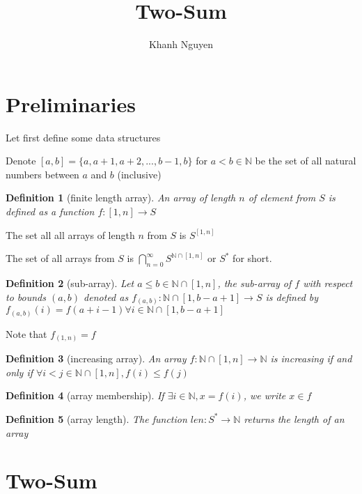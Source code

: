 \documentclass{article}
\title{Two-Sum}
\author{Khanh Nguyen}
\newtheorem{definition}{Definition}
\begin{document}
\maketitle


\section{Preliminaries}

Let first define some data structures

Denote $[a, b] = \{a, a+1, a+2, ..., b-1, b\}$ for $a < b \in \mathbb{N}$ be the set of all natural numbers between $a$ and $b$ (inclusive)


\begin{definition}[finite length array]
An array of length $n$ of element from $S$ is defined as a function $f: [1, n] \to S$
\end{definition}

The set all all arrays of length $n$ from $S$ is $S^{[1, n]}$


The set of all arrays from $S$ is $\bigcap_{n=0}^{\infty} S^{\mathbb{N} \cap [1, n]}$ or $S^*$ for short.

\begin{definition}[sub-array]
Let $a \leq b \in \mathbb{N} \cap [1, n]$, the sub-array of $f$ with respect to bounds $(a, b)$ denoted as $f_{(a, b)}: \mathbb{N} \cap [1, b-a+1] \to S$ is defined by $f_{(a, b)}(i) = f(a+i-1) \forall i \in \mathbb{N} \cap [1, b-a+1]$
\end{definition}

Note that $f_{(1, n)} = f$

\begin{definition}[increasing array]
An array $f: \mathbb{N} \cap [1, n] \to \mathbb{N}$ is increasing if and only if $\forall i < j \in \mathbb{N} \cap [1, n], f(i) \leq f(j)$
\end{definition}

\begin{definition}[array membership]
If $\exists i \in \mathbb{N}, x = f(i)$, we write $x \in f$
\end{definition}

\begin{definition}[array length]
The function $len : S^* \to \mathbb{N}$ returns the length of an array
\end{definition}

\section{Two-Sum}
\end{document}
